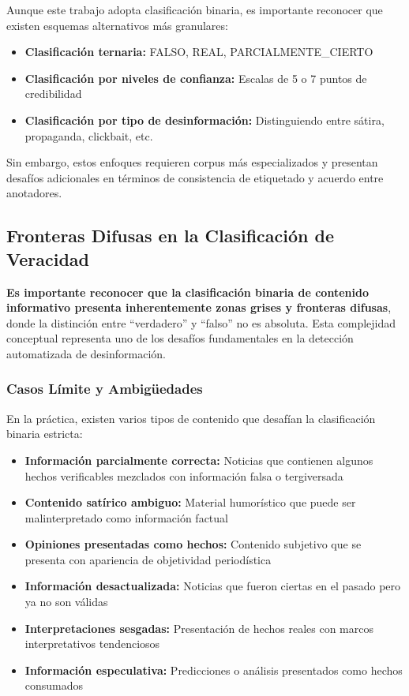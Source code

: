 Aunque este trabajo adopta clasificación binaria, es importante reconocer que existen esquemas alternativos más granulares:

\begin{itemize}
    \item \textbf{Clasificación ternaria:} FALSO, REAL, PARCIALMENTE\_CIERTO
    \item \textbf{Clasificación por niveles de confianza:} Escalas de 5 o 7 puntos de credibilidad
    \item \textbf{Clasificación por tipo de desinformación:} Distinguiendo entre sátira, propaganda, clickbait, etc.
\end{itemize}

Sin embargo, estos enfoques requieren corpus más especializados y presentan desafíos adicionales en términos de consistencia de etiquetado y acuerdo entre anotadores.

\subsection{Fronteras Difusas en la Clasificación de Veracidad}
\label{subsec:fronteras_difusas}

\textbf{Es importante reconocer que la clasificación binaria de contenido informativo presenta inherentemente zonas grises y fronteras difusas}, donde la distinción entre ``verdadero'' y ``falso'' no es absoluta. Esta complejidad conceptual representa uno de los desafíos fundamentales en la detección automatizada de desinformación.

\subsubsection{Casos Límite y Ambigüedades}

En la práctica, existen varios tipos de contenido que desafían la clasificación binaria estricta:

\begin{itemize}
    \item \textbf{Información parcialmente correcta:} Noticias que contienen algunos hechos verificables mezclados con información falsa o tergiversada
    \item \textbf{Contenido satírico ambiguo:} Material humorístico que puede ser malinterpretado como información factual
    \item \textbf{Opiniones presentadas como hechos:} Contenido subjetivo que se presenta con apariencia de objetividad periodística
    \item \textbf{Información desactualizada:} Noticias que fueron ciertas en el pasado pero ya no son válidas
    \item \textbf{Interpretaciones sesgadas:} Presentación de hechos reales con marcos interpretativos tendenciosos
    \item \textbf{Información especulativa:} Predicciones o análisis presentados como hechos consumados
\end{itemize}

